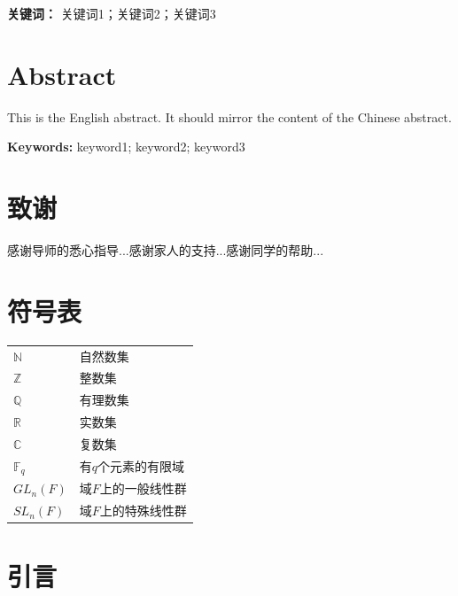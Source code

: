 \documentclass[12pt,a4paper]{report}
\theoremstyle{definition}
\begin{document}
\vspace{1em}
\noindent\textbf{关键词：} 关键词1；关键词2；关键词3

\newpage

\chapter*{Abstract}

This is the English abstract. It should mirror the content of the Chinese abstract.

\vspace{1em}
\noindent\textbf{Keywords:} keyword1; keyword2; keyword3

\newpage

\chapter*{致谢}

感谢导师的悉心指导...感谢家人的支持...感谢同学的帮助...

\newpage

\tableofcontents
\newpage

\chapter*{符号表}

\begin{tabular}{ll}
    $\mathbb{N}$ & 自然数集 \\
    $\mathbb{Z}$ & 整数集 \\
    $\mathbb{Q}$ & 有理数集 \\
    $\mathbb{R}$ & 实数集 \\
    $\mathbb{C}$ & 复数集 \\
    $\mathbb{F}_q$ & 有$q$个元素的有限域 \\
    $GL_n(F)$ & 域$F$上的一般线性群 \\
    $SL_n(F)$ & 域$F$上的特殊线性群
\end{tabular}

\newpage

\chapter{引言}\label{ch:intro}
\end{document}

